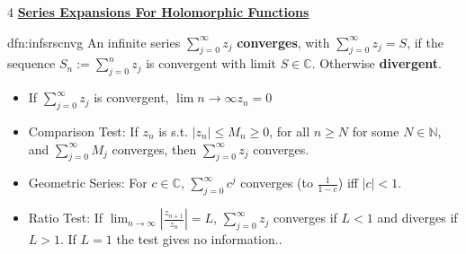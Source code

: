 \documentclass[landscape, 8pt]{extarticle}
\begin{document}
\begin{multicols*}{4}
	{\footnotesize \textbf{\underline{Series Expansions For Holomorphic Functions}}}
		
		
		\begin{dfn}{dfn:infsrscnvg}{ }
			An infinite series $\sum_{j=0}^{\infty}z_j$ \textbf{converges}, with $\sum_{j=0}^{\infty}z_j = S$, if the sequence $S_n := \sum_{j =0}^{n}z_j$ is convergent with limit $S \in \mathbb{C}$. Otherwise \textbf{divergent}.
			\begin{itemize}
				\item If $\sum_{j=0}^{\infty}z_j$ is convergent, $\lim{n\to \infty} z_n = 0$
				\item Comparison Test: If $z_n$ is s.t. $\left|z_n\right| \le M_n \ge 0$, for all $n \ge N$ for some $N \in \mathbb{N}$, and $\sum_{j = 0}^{\infty} M_j$ converges, then $\sum_{j=0}^{\infty}z_j$ converges.
				\item Geometric Series: For $c \in \mathbb{C}$, $\sum_{j=0}^{\infty}c^j$ converges (to $\frac{1}{1-c}$) iff $\left|c\right| < 1$.
				\item Ratio Test: If $\lim_{n\to \infty} \left|\frac{z_{n+1}}{z_n}\right| = L$, $\sum_{j=0}^{\infty}z_j$ converges if $L < 1$ and diverges if $L > 1$. If $L = 1$ the test gives no information..
			\end{itemize}
			
		\end{dfn}
		

\end{multicols*}
\end{document}
